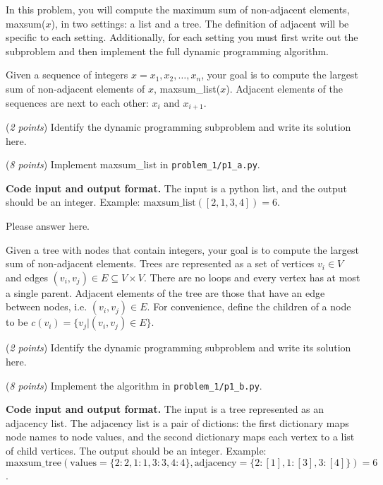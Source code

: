 \documentclass{hw_template}
\newcommand{\io}{\textbf{Code input and output format.} }
\begin{document}

\begin{problem}
In this problem, you will compute the maximum sum of non-adjacent elements,
maxsum($x$), in two settings:
a list and a tree.
The definition of adjacent will be specific to each setting.
Additionally, for each setting you must first write out the subproblem
and then implement the full dynamic programming algorithm.

\begin{subproblem}
Given a sequence of integers $ x = x_1,x_2,\ldots,x_n $,
your goal is to compute the largest sum of non-adjacent elements of $x$,
maxsum\_list($x$).
Adjacent elements of the sequences are next to each other: $x_i$ and $x_{i+1}$.

(\textit{2 points}) Identify the dynamic programming subproblem and write its solution here.

(\textit{8 points}) Implement maxsum\_list in \texttt{problem\_1/p1\_a.py}.
\end{subproblem}

\io The input is a python list, and the output should be an integer.
Example: $\text{maxsum\_list}([2,1,3,4]) = 6$.

\begin{solution}
Please answer here.
\end{solution}

\begin{subproblem}
Given a tree with nodes that contain integers,
your goal is to compute the largest sum of non-adjacent elements.
Trees are represented as a set of vertices
$v_i \in V$ and edges $(v_i, v_j) \in E \subseteq V\times V$.
There are no loops and every vertex has at most a single parent.
Adjacent elements of the tree are those that have an edge between nodes, i.e. $(v_i,v_j)\in E$.
For convenience, define the children of a node to be $c(v_i) = \{v_j | (v_i,v_j)\in E\}$.

(\textit{2 points}) Identify the dynamic programming subproblem and write its solution here.

(\textit{8 points}) Implement the algorithm in \texttt{problem\_1/p1\_b.py}.
\end{subproblem}

\io The input is a tree represented as an adjacency list.
The adjacency list is a pair of dictions:
the first dictionary maps node names to node values,
and the second dictionary maps each vertex to a list of
child vertices.
The output should be an integer.
Example: $\text{maxsum\_tree}(\text{values} = \{2: 2, 1:1, 3:3, 4:4\}, \text{adjacency}=\{2: [1], 1: [3], 3: [4]\}) = 6$.


\end{problem}
\end{document}
